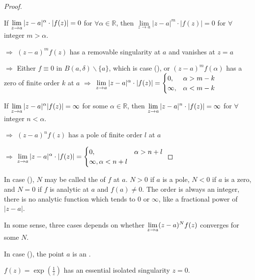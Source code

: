 \begin{proof}
    \,
    
     If  $ \displaystyle\lim\limits_{z\to a}|z-a|^\alpha \cdot |f(z)|=0 $ for  $ \forall \alpha\in \mathbb{R} $, then  $ \lim\limits_{z\to a}|z-a|^m\cdot |f(z)|=0 $ for  $ \forall  $ integer  $ m>\alpha $. 
    
     $ \Rightarrow $  $ (z-a)^mf(z) $ has a removable singularity at  $ a $ and vanishes at  $ z=a $ 

      $ \Rightarrow  $ Either  $ f\equiv 0 $ in  $ B(a,\delta)\backslash \{a\} $, which is case  (), or $ (z-a)^mf(\alpha) $ has a zero of finite order  $ k $ at  $ a $  $ \Rightarrow $ $ \displaystyle\lim\limits_{z\to a}|z-a|^\alpha\cdot |f(z)|=\begin{cases}
        0, &\alpha>m-k \\
        \infty,&\alpha<m-k
      \end{cases} $   

       If  $ \displaystyle\lim\limits_{z\to a}|z-a|^\alpha |f(z)|=\infty $ for some  $ \alpha\in \mathbb{R} $, then  $ \displaystyle\lim\limits_{z\to a}|z-a|^n\cdot |f(z)|=\infty $ for  $ \forall $ integer  $ n<\alpha $.
      
       $ \Rightarrow  $ $ (z-a)^nf(z) $ has a pole of finite order  $ l $ at  $ a $
       
        $ \Rightarrow $  $ \displaystyle\lim\limits_{z\to a}|z-a|^\alpha \cdot |f(z)|=\begin{cases}
            0,&\alpha>n+l \\
            \infty, \alpha<n+l
        \end{cases} $  
\end{proof}
\begin{remark}
    In case (),  $ N $ may be called the  of  $ f $ at  $ a $.  $ N>0 $ if  $ a $  is a pole,  $ N<0 $ if  $ a $ is a zero, and  $ N=0 $  if  $ f $ is analytic at  $ a $ and  $ f(a)\not=0 $. The order is always an integer, there is no analytic function which tends to  $ 0 $ or  $ \infty $, like a fractional power of  $ |z-a| $.

    In some sense, three cases depends on whether  $ \displaystyle\lim\limits_{z\to a}(z-a)^Nf(z) $ converges for some  $ N $. 
    
    In case (), the point  $ a $ is an . 
\end{remark}
\begin{example}
    $ f(z)=\exp(\frac{1}{z}) $ has an essential isolated singularity  $ z=0 $.  
\end{example}
